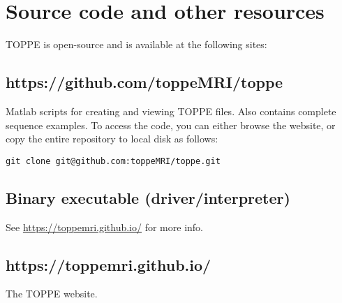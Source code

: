 \section{Source code and other resources}

TOPPE is open-source and is available at the following sites:

\subsection{https://github.com/toppeMRI/toppe}

Matlab scripts for creating and viewing TOPPE files. Also contains complete sequence examples.
To access the code, you can either browse the website, or copy the entire repository to local disk as follows:

\begin{lstlisting}
git clone git@github.com:toppeMRI/toppe.git
\end{lstlisting}


\subsection{Binary executable (driver/interpreter)}

See \url{https://toppemri.github.io/} for more info.


\subsection{https://toppemri.github.io/}

The TOPPE website.




